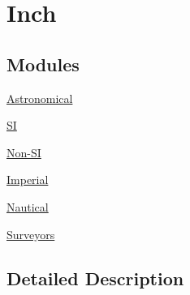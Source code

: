 \hypertarget{group___e_g_x_math-_conversions-_length_conversions-_imperial-_inch}{}\section{Inch}
\label{group___e_g_x_math-_conversions-_length_conversions-_imperial-_inch}
\subsection*{Modules}
\begin{DoxyCompactItemize}
\item 
\mbox{\hyperlink{group___e_g_x_math-_conversions-_length_conversions-_imperial-_inch-_astronomical}{Astronomical}}
\item 
\mbox{\hyperlink{group___e_g_x_math-_conversions-_length_conversions-_imperial-_inch-_s_i}{SI}}
\item 
\mbox{\hyperlink{group___e_g_x_math-_conversions-_length_conversions-_imperial-_inch-_non-_s_i}{Non-\/\+SI}}
\item 
\mbox{\hyperlink{group___e_g_x_math-_conversions-_length_conversions-_imperial-_inch-_imperial}{Imperial}}
\item 
\mbox{\hyperlink{group___e_g_x_math-_conversions-_length_conversions-_imperial-_inch-_nautical}{Nautical}}
\item 
\mbox{\hyperlink{group___e_g_x_math-_conversions-_length_conversions-_imperial-_inch-_surveyors}{Surveyors}}
\end{DoxyCompactItemize}


\subsection{Detailed Description}
